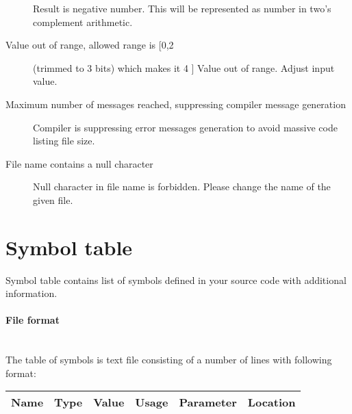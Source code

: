 \begin{description}
                Result is negative number. This will be represented as number in two's complement arithmetic.
            \item[Value out of range, allowed range is [0,2] (trimmed to 3 bits) which makes it 4 ]
                Value out of range. Adjust input value.
            \item[Maximum number of messages reached, suppressing compiler message generation ]
                Compiler is suppressing error messages generation to avoid massive code listing file size.
            \item[File name contains a null character ]
                Null character in file name is forbidden. Please change the name of the given file.
        \end{description}

\section{Symbol table}
    Symbol table contains list of symbols defined in your source code with additional information.

    \paragraph{File format}
        ~\\
        The table of symbols is text file consisting of a number of lines with following format:\\
        \begin{tabular}{|cccccc|}
            \hline
            Name & Type & Value & Usage & Parameter & Location \\
            \hline
        \end{tabular}

